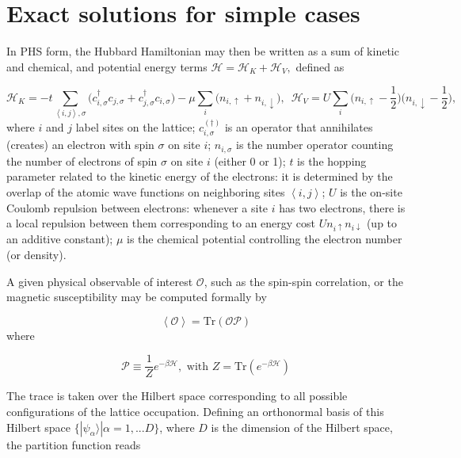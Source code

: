 \section{Exact solutions for simple cases}\label{sec:exactSolutions}

In \ac{PHS} form, the Hubbard Hamiltonian may then be written as a sum of kinetic and chemical, and potential energy terms 
$
\mathcal{H} = \mathcal{H}_K + \mathcal{H}_V ,
$
defined as

\begin{equation}\label{eq:def_energies}
\mathcal{H}_K = -t \sum_{\left\langle i, j \right \rangle, \sigma} \bigg( c_{i,\sigma}^\dagger c_{j,\sigma} + c_{j,\sigma}^\dagger c_{i,\sigma} \bigg) -\mu \sum_i \bigg( n_{i,\uparrow} + n_{i,\downarrow} \bigg) , \,\,\,
\mathcal{H}_V = U \sum_{i} \bigg( n_{i,\uparrow} - \frac{1}{2} \bigg) \bigg( n_{i,\downarrow} - \frac{1}{2} \bigg) ,
\end{equation}
where $i$ and $j$ label sites on the lattice; $c_{i,\sigma}^{(\dagger)}$ is an operator that annihilates (creates) an electron with spin $\sigma$ on site $i$; $n_{i,\sigma}$ is the number operator counting the number of electrons of spin $\sigma$ on site $i$ (either 0 or 1); $t$ is the hopping parameter related to the kinetic energy of the electrons: it is determined by the overlap of the atomic wave functions on neighboring sites $\left\langle i, j \right\rangle$; $U$ is the on-site Coulomb repulsion between electrons: whenever a site $i$ has two electrons, there is a local repulsion between them corresponding to an energy cost $U n_{i \uparrow} n_{i \downarrow}$ (up to an additive constant); $\mu$ is the chemical potential controlling the electron number (or density).

A given physical observable of interest $\mathcal{O}$, such as the spin-spin correlation, or the magnetic susceptibility may be computed formally by

\begin{equation}
\left\langle \mathcal{O} \right\rangle = \text{Tr} ( \mathcal{O} \mathcal{P} )
\end{equation}
where

\begin{equation}\label{eq:projection}
\mathcal{P} \equiv \frac{1}{Z} e^{-\beta \mathcal{H} } , \text{ with } Z = \text{Tr} ( e^{-\beta \mathcal{H} } )
\end{equation}

The trace is taken over the Hilbert space corresponding to all possible configurations of the lattice occupation.
Defining an orthonormal basis of this Hilbert space $\{ | \psi_\alpha \rangle | \alpha = 1, ... D \} $, where $D$ is the dimension of the Hilbert space, the partition function reads

